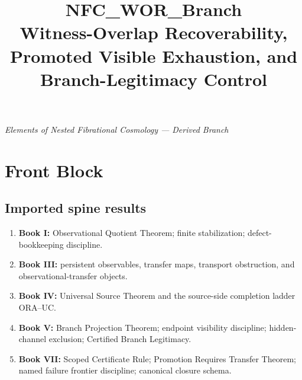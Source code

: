 \documentclass[11pt]{article}
\title{\textbf{NFC\_WOR\_Branch}\\
Witness-Overlap Recoverability, Promoted Visible Exhaustion, and Branch-Legitimacy Control}
\author{}
\date{}
\theoremstyle{definition}
\theoremstyle{remark}
\begin{document}
\maketitle

\begin{center}
\textit{Elements of Nested Fibrational Cosmology --- Derived Branch}
\end{center}

\tableofcontents

\section*{Front Block}

\subsection*{Imported spine results}
\begin{enumerate}[label=(\arabic*)]
    \item \textbf{Book I:} Observational Quotient Theorem; finite stabilization; defect-bookkeeping discipline.
    \item \textbf{Book III:} persistent observables, transfer maps, transport obstruction, and observational-transfer objects.
    \item \textbf{Book IV:} Universal Source Theorem and the source-side completion ladder ORA--UC.
    \item \textbf{Book V:} Branch Projection Theorem; endpoint visibility discipline; hidden-channel exclusion; Certified Branch Legitimacy.
    \item \textbf{Book VII:} Scoped Certificate Rule; Promotion Requires Transfer Theorem; named failure frontier discipline; canonical closure schema.
\end{enumerate}
\end{document}
